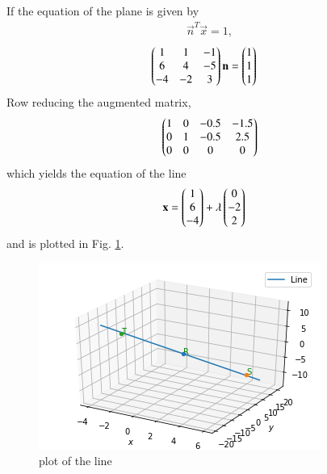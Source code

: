 
If the equation of the plane is given by
\begin{align}
\vec{n}^T\vec{x} = 1,
\end{align}
\begin{align}
\begin{pmatrix}1&1&-1 \\ 6&4&-5 \\ -4&-2&3\end{pmatrix} \mathbf{n} &= \begin{pmatrix}1\\1\\1\end{pmatrix}
\end{align}
Row reducing the augmented matrix, 
\begin{align}
\begin{pmatrix}1 & 0 & -0.5 & -1.5\\0 & 1 & -0.5 & 2.5\\0 & 0 & 0 & 0\end{pmatrix}
\end{align}
which yields the  equation of the line
\begin{align}
\mathbf{x} &= \begin{pmatrix}1 \\ 6 \\ -4\end{pmatrix}+\lambda\begin{pmatrix}0 \\ -2 \\2\end{pmatrix}
\end{align}
and is plotted in Fig. \ref{linform/38/a/Plot of the line}.
\begin{figure}[ht]
\centering
\includegraphics[width=\columnwidth]{solutions/su2021/2/36/a/download (5).png}
\caption{plot of the line}
\label{linform/38/a/Plot of the line}
\end{figure}


